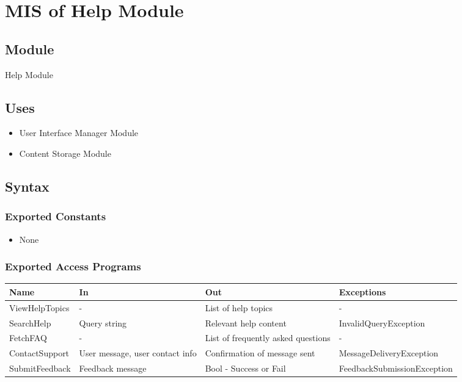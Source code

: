 \documentclass[12pt, titlepage]{article}
\begin{document}
\newpage


\section{MIS of Help Module} \label{Module_Help}

\subsection{Module}

Help Module

\subsection{Uses}

\begin{itemize}
    \item User Interface Manager Module
    \item Content Storage Module
\end{itemize}

\subsection{Syntax}

\subsubsection{Exported Constants}

\begin{itemize}
    \item None
\end{itemize}

\subsubsection{Exported Access Programs}

\begin{center}
\begin{tabular}{p{3cm} p{4cm} p{4cm} p{5cm}}
\hline
\textbf{Name} & \textbf{In} & \textbf{Out} & \textbf{Exceptions} \\
\hline
ViewHelpTopics & - & List of help topics & - \\
\hline
SearchHelp & Query string & Relevant help content & InvalidQueryException \\
\hline
FetchFAQ & - & List of frequently asked questions & - \\
\hline
ContactSupport & User message, user contact info & Confirmation of message sent & MessageDeliveryException \\
\hline
SubmitFeedback & Feedback message & Bool - Success or Fail & FeedbackSubmissionException \\
\hline
\end{tabular}
\end{center}
\end{document}
